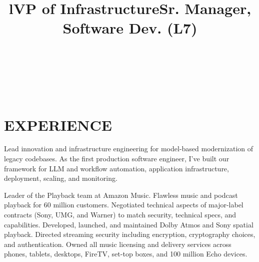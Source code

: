 \documentclass[margin]{res}
\begin{document}
\bigskip

\address{2528 Chilton Way\\ken@hero.net}
\address{Berkeley, CA 94704\\(310) 383-7981}

\begin{resume}

\begin{format}
\title{l}\\
\\
\body\\
\end{format}

\section{EXPERIENCE}

\title{\textbf{VP of Infrastructure}}
\begin{position}
\hspace*{.5cm}Lead innovation and infrastructure engineering for model-based modernization of legacy codebases. As the first production software engineer, I've built our framework for LLM and workflow automation, application infrastructure, deployment, scaling, and monitoring.
\end{position}

\title{\textbf{Sr. Manager, Software Dev. (L7)}}
\begin{position}
\hspace*{.25cm}Leader of the Playback team at Amazon Music. Flawless music and podcast playback for 60 million customers. Negotiated technical aspects of major-label contracts (Sony, UMG, and Warner) to match security, technical specs, and capabilities. Developed, launched, and maintained Dolby Atmos and Sony spatial playback. Directed streaming security including encryption, cryptography choices, and authentication. Owned all music licensing and delivery services across phones, tablets, desktops, FireTV, set-top boxes, and 100 million Echo devices. 
\end{position}


\end{resume}
\end{document}
